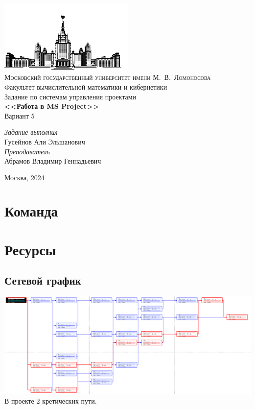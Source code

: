 \documentclass[14pt]{article}
\begin{document}
\thispagestyle{empty}
\begin{center}
	\ \vspace{-4cm}\\
	\includegraphics[width=0.5\textwidth]{../img/msu.png}\\
	{\scshape Московский государственный университет имени М.~В.~Ломоносова}\\
	Факультет вычислительной  математики и кибернетики\\
	\vfill
	{\LARGE Задание по системам управления проектами}\\
	\vspace{1cm}
	{\Huge\bfseries <<Работа в MS Project>>}\\
	{\Huge Вариант 5} 
\end{center}
\vspace{1cm}
\begin{flushright}
	\large
	\textit{Задание выполнил}\\
	Гусейнов Али Эльшанович\\
	\vspace{5mm}
	\textit{Преподаватель}\\
	Абрамов Владимир Геннадьевич
\end{flushright}
\vfill
\begin{center}
	Москва, 2024
\end{center}
\clearpage
\tableofcontents
\clearpage
\section{Команда}
\section{Ресурсы}
	\subsection{Сетевой график}
	\includegraphics[width=\textwidth]{../img/init_network_graph.png}\\
	В проекте 2 кретических пути.
\end{document}
